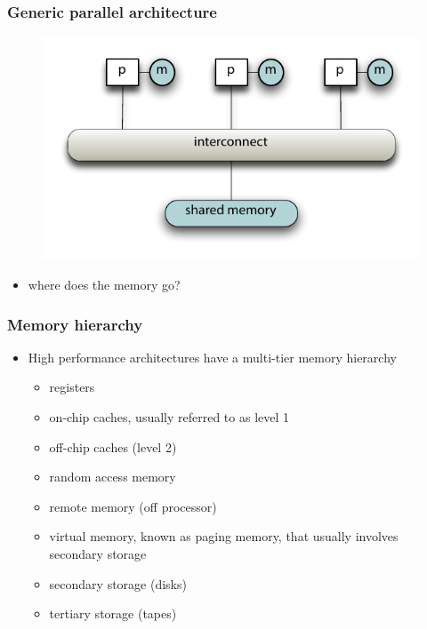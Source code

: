 \begin{frame}[fragile]
%
  \frametitle{Generic parallel architecture}
%
  \begin{figure}
    \centering
    \includegraphics[width=.75\linewidth]{figures/generic-parallel-architecture.pdf}
    \label{fig:generic-parallel-architecture}
  \end{figure}

  \begin{itemize}
%
  \item where does the memory go?
%
  \end{itemize}
%
\end{frame}

\begin{frame}[fragile]
%
  \frametitle{Memory hierarchy}
%
  \begin{itemize}
  \item High performance architectures have a multi-tier memory hierarchy
%
    \begin{itemize}
%
    \item registers
    \item on-chip caches, usually referred to as level 1
    \item off-chip caches (level 2)
    \item random access memory
    \item remote memory (off processor)
    \item virtual memory, known as paging memory, that usually involves secondary storage
    \item secondary storage (disks)
    \item tertiary storage (tapes)
%
    \end{itemize}
%
  \end{itemize}
%
\end{frame}

